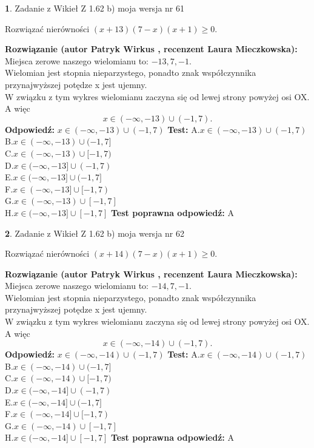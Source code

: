 \documentclass[12pt, a4paper]{article}
\theoremstyle{definition} %
\newtheorem{zad}{}
\newcommand{\zadStart}[1]{\begin{zad}#1\newline}
\newcommand{\zadStop}{\end{zad}}
\newcommand{\rozwStart}[2]{\noindent \textbf{Rozwiązanie (autor #1 , recenzent #2): }\newline}
\newcommand{\rozwStop}{\newline}
\newcommand{\odpStart}{\noindent \textbf{Odpowiedź:}\newline}
\newcommand{\odpStop}{\newline}
\newcommand{\testStart}{\noindent \textbf{Test:}\newline}
\newcommand{\testStop}{\newline}
\newcommand{\kluczStart}{\noindent \textbf{Test poprawna odpowiedź:}\newline}
\newcommand{\kluczStop}{\newline}
\begin{document}
\zadStart{Zadanie z Wikieł Z 1.62 b) moja wersja nr 61}

Rozwiązać nierówności $(x+13)(7-x)(x+1)\ge0$.
\zadStop
\rozwStart{Patryk Wirkus}{Laura Mieczkowska}
Miejsca zerowe naszego wielomianu to: $-13, 7, -1$.\\
Wielomian jest stopnia nieparzystego, ponadto znak współczynnika przy\linebreak najwyższej potędze x jest ujemny.\\ W związku z tym wykres wielomianu zaczyna się od lewej strony powyżej osi OX. A więc $$x \in (-\infty,-13) \cup (-1,7).$$
\rozwStop
\odpStart
$x \in (-\infty,-13) \cup (-1,7)$
\odpStop
\testStart
A.$x \in (-\infty,-13) \cup (-1,7)$\\
B.$x \in (-\infty,-13) \cup (-1,7]$\\
C.$x \in (-\infty,-13) \cup [-1,7)$\\
D.$x \in (-\infty,-13] \cup (-1,7)$\\
E.$x \in (-\infty,-13] \cup (-1,7]$\\
F.$x \in (-\infty,-13] \cup [-1,7)$\\
G.$x \in (-\infty,-13) \cup [-1,7]$\\
H.$x \in (-\infty,-13] \cup [-1,7]$
\testStop
\kluczStart
A
\kluczStop



\zadStart{Zadanie z Wikieł Z 1.62 b) moja wersja nr 62}

Rozwiązać nierówności $(x+14)(7-x)(x+1)\ge0$.
\zadStop
\rozwStart{Patryk Wirkus}{Laura Mieczkowska}
Miejsca zerowe naszego wielomianu to: $-14, 7, -1$.\\
Wielomian jest stopnia nieparzystego, ponadto znak współczynnika przy\linebreak najwyższej potędze x jest ujemny.\\ W związku z tym wykres wielomianu zaczyna się od lewej strony powyżej osi OX. A więc $$x \in (-\infty,-14) \cup (-1,7).$$
\rozwStop
\odpStart
$x \in (-\infty,-14) \cup (-1,7)$
\odpStop
\testStart
A.$x \in (-\infty,-14) \cup (-1,7)$\\
B.$x \in (-\infty,-14) \cup (-1,7]$\\
C.$x \in (-\infty,-14) \cup [-1,7)$\\
D.$x \in (-\infty,-14] \cup (-1,7)$\\
E.$x \in (-\infty,-14] \cup (-1,7]$\\
F.$x \in (-\infty,-14] \cup [-1,7)$\\
G.$x \in (-\infty,-14) \cup [-1,7]$\\
H.$x \in (-\infty,-14] \cup [-1,7]$
\testStop
\kluczStart
A
\kluczStop
\end{document}
